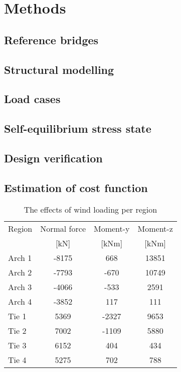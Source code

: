 \section{Methods}\label{sec:methods}
\subsection{Reference bridges}

\subsection{Structural modelling}

\subsection{Load cases}

\subsection{Self-equilibrium stress state}

\subsection{Design verification}

\subsection{Estimation of cost function}





\begin{table}[H] 
\caption{The effects of wind loading per region}
\centering
\begin{tabular}{lccc}
\hline
Region & Normal force & Moment-y & Moment-z \\
 & [kN]   & [kNm] & [kNm] \\ \hline
Arch 1 & -8175 & 668 & 13851\\
Arch 2 & -7793 & -670 & 10749\\
Arch 3 & -4066 & -533 & 2591\\
Arch 4 & -3852 & 117 & 111\\
Tie 1 & 5369 & -2327 & 9653\\
Tie 2 & 7002 & -1109 & 5880\\
Tie 3 & 6152 & 404 & 434\\
Tie 4 & 5275 & 702 & 788\\ \hline
\end{tabular}
\end{table}

